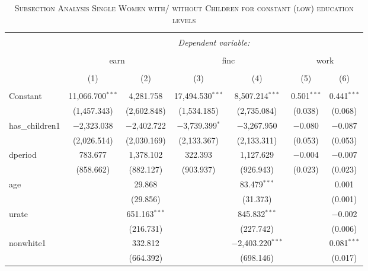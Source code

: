 \documentclass[a4paper]{article}
\begin{document}
\begin{table}[!htbp] \centering 
\begin{adjustwidth}{0.cm}{-0cm}
\begin{threeparttable}
\small
\captionsetup{font=small, justification=raggedright,singlelinecheck=false}
\caption{\textsc{Subsection Analysis Single Women with/ without Children for constant (low) education levels}}
\centering 
  \label{}
\small 
\begin{tabular}{@{\extracolsep{3pt}}lcccccc} 
\\[-5.8ex]\hline 
\hline \\[-1.8ex] 
 & \multicolumn{6}{c}{\textit{Dependent variable:}} \\ 
\cline{2-7} 
\\[-1.8ex] & \multicolumn{2}{c}{earn} & \multicolumn{2}{c}{finc} & \multicolumn{2}{c}{work} \\ 
\\[-1.8ex] & (1) & (2) & (3) & (4) & (5) & (6)\\ 
\hline \\[-1.8ex] 
 Constant & 11,066.700$^{***}$ & 4,281.758 & 17,494.530$^{***}$ & 8,507.214$^{***}$ & 0.501$^{***}$ & 0.441$^{***}$ \\ 
  & (1,457.343) & (2,602.848) & (1,534.185) & (2,735.084) & (0.038) & (0.068) \\ 
  has\_children1 & $-$2,323.038 & $-$2,402.722 & $-$3,739.399$^{*}$ & $-$3,267.950 & $-$0.080 & $-$0.087 \\ 
  & (2,026.514) & (2,030.169) & (2,133.367) & (2,133.311) & (0.053) & (0.053) \\ 
  dperiod & 783.677 & 1,378.102 & 322.393 & 1,127.629 & $-$0.004 & $-$0.007 \\ 
  & (858.662) & (882.127) & (903.937) & (926.943) & (0.023) & (0.023) \\ 
  age &  & 29.868 &  & 83.479$^{***}$ &  & 0.001 \\ 
  &  & (29.856) &  & (31.373) &  & (0.001) \\ 
  urate &  & 651.163$^{***}$ &  & 845.832$^{***}$ &  & $-$0.002 \\ 
  &  & (216.731) &  & (227.742) &  & (0.006) \\ 
  nonwhite1 &  & 332.812 &  & $-$2,403.220$^{***}$ &  & 0.081$^{***}$ \\ 
  &  & (664.392) &  & (698.146) &  & (0.017) \\ 

\end{tabular}
\end{threeparttable}
\end{adjustwidth}
\end{table}
\end{document}

